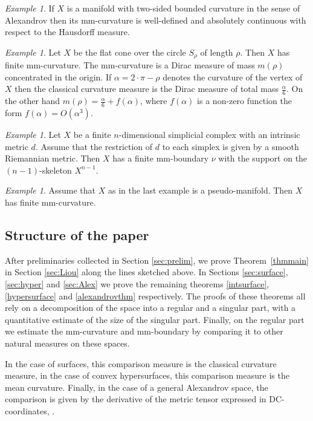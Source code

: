 \documentclass[12pt,leqno,intlimits]{amsart}
\numberwithin{equation}{section}
\theoremstyle{definition}
\theoremstyle{remark}
\newtheorem{ex}[thm]{Example}
\newcommand{\tref}[1]{Theorem~\ref{#1}}
\begin{document}
\begin{ex}
If $X$ is a manifold with two-sided bounded curvature in the sense of Alexandrov then its mm-curvature is well-defined and absolutely continuous with respect to the Hausdorff measure.
\end{ex}

\begin{ex} \label{ex:cone}
Let $X$ be the flat cone over the circle $S_{\rho}$ of length $\rho$.
Then $X$ has finite mm-curvature. The mm-curvature is a Dirac measure of mass $m(\rho)$ concentrated in the origin.
If $\alpha =2{\cdot}\pi-\rho$ denotes the curvature of the vertex of $X$ then the classical curvature measure is the Dirac measure of total mass
$\frac \alpha 6$. On the other hand $m(\rho)= \frac \alpha 6 + f(\alpha)$, where
$f(\alpha)$ is a non-zero function the form $f(\alpha)= O(\alpha ^3)$.
\end{ex}

\begin{ex} \label{ex:secondlast}
Let $X$ be a finite $n$-dimensional simplicial complex with an intrinsic metric $d$.
Assume that the restriction of $d$ to each simplex is given by a smooth Riemannian metric.
Then $X$ has a finite mm-boundary $\nu$ with the support on the $(n-1)$-skeleton $X^{n-1}$.
\end{ex}

\begin{ex} \label{ex:last}
Assume that $X$ as in the last example is a pseudo-manifold.
Then $X$ has finite mm-curvature.
\end{ex}

\subsection{Structure of the paper}
After preliminaries collected in Section \ref{sec:prelim}, we prove \tref{thmmain} in Section \ref{sec:Liou} along the lines sketched above.
In Sections \ref{sec:surface}, \ref{sec:hyper} and \ref{sec:Alex} we prove the remaining theorems \ref{intsurface}, \ref{hypersurface} and \ref{alexandrovthm} respectively.
The proofs of these theorems all rely on a decomposition of the space into a regular and a singular part, with a quantitative estimate of the size of the singular part.
Finally, on the regular part we estimate the mm-curvature and mm-boundary  by comparing it to other natural measures on these spaces.

In the case of surfaces, this comparison measure is the classical curvature measure, in the case of convex hypersurfaces, this comparison measure is the mean curvature.
Finally, in the case of a general Alexandrov space, the comparison is given by the derivative of the metric tensor expressed in DC-coordinates, \cite{Per-DC}.
\end{document}
